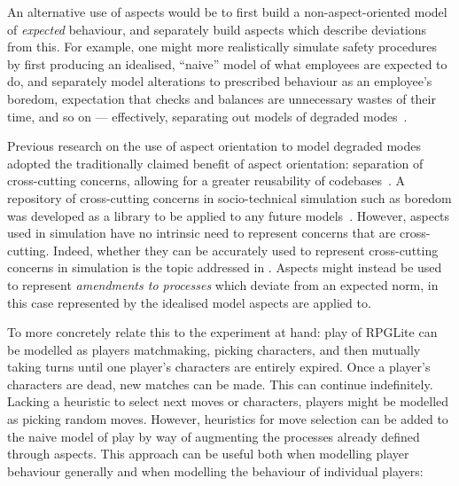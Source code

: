 An alternative use of aspects would be to first build a non-aspect-oriented
model of \emph{expected} behaviour, and separately build aspects which describe
deviations from this. For example, one might more realistically simulate safety
procedures by first producing an idealised, ``naive'' model of what employees
are expected to do, and separately model alterations to prescribed behaviour as
an employee's boredom, expectation that checks and balances are unnecessary
wastes of their time, and so on --- effectively, separating out models of
degraded modes~\cite{johnson2007degradedmodes}.

Previous research on the use of aspect orientation to model degraded modes
adopted the traditionally claimed benefit of aspect orientation: separation of
cross-cutting concerns, allowing for a greater reusability of
codebases~\cite{wallis2018caise}. A repository of cross-cutting concerns in
socio-technical simulation such as boredom was developed as a library to be
applied to any future models~\cite{fuzzimoss_repo}. However, aspects used in
simulation have no intrinsic need to represent concerns that are cross-cutting.
Indeed, whether they can be accurately used to represent cross-cutting concerns
in simulation is the topic addressed in . Aspects
might instead be used to represent \emph{amendments to processes} which deviate
from an expected norm, in this case represented by the idealised model aspects
are applied to.

To more concretely relate this to the experiment at hand: play of RPGLite can be
modelled as players matchmaking, picking characters, and then mutually taking
turns until one player's characters are entirely expired. Once a player's
characters are dead, new matches can be made. This can continue indefinitely.
Lacking a heuristic to select next moves or characters, players might be
modelled as picking random moves. However, heuristics for move selection can be
added to the naive model of play by way of augmenting the processes already
defined through aspects. This approach can be useful both when
modelling player behaviour generally and when modelling the behaviour of
individual players: 

